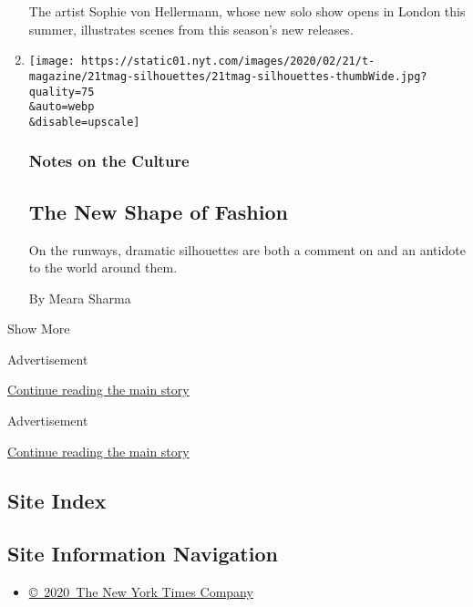 \begin{enumerate}
  The artist Sophie von Hellermann, whose new solo show opens in London
  this summer, illustrates scenes from this season's new releases.
\item
  \href{/2020/02/20/t-magazine/fashion-silhouettes.html}{}

  \texttt{[image: https://static01.nyt.com/images/2020/02/21/t-magazine/21tmag-silhouettes/21tmag-silhouettes-thumbWide.jpg?quality=75\\\&auto=webp\\\&disable=upscale]}

  \hypertarget{notes-on-the-culture-1}{%
  \subsubsection{Notes on the Culture}\label{notes-on-the-culture-1}}

  \hypertarget{the-new-shape-of-fashion}{%
  \subsection{The New Shape of Fashion}\label{the-new-shape-of-fashion}}

  On the runways, dramatic silhouettes are both a comment on and an
  antidote to the world around them.

  By Meara Sharma
\end{enumerate}

Show More

Advertisement

\protect\hyperlink{after-mid2}{Continue reading the main story}

Advertisement

\protect\hyperlink{after-mktg}{Continue reading the main story}

\hypertarget{site-index}{%
\subsection{Site Index}\label{site-index}}

\hypertarget{site-information-navigation}{%
\subsection{Site Information
Navigation}\label{site-information-navigation}}

\begin{itemize}
\tightlist
\item
  \href{https://help.nytimes.com/hc/en-us/articles/115014792127-Copyright-notice}{©~2020~The
  New York Times Company}
\end{itemize}

